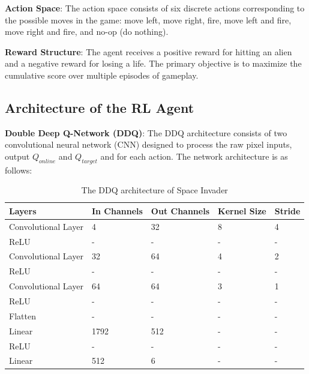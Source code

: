 \documentclass[preprint,12pt,3p,times]{elsarticle}
\begin{document}
\textbf{Action Space}: The action space consists of six discrete actions corresponding to the possible moves in the game: move left, move right, fire, move left and fire, move right and fire, and no-op (do nothing).

\textbf{Reward Structure}: The agent receives a positive reward for hitting an alien and a negative reward for losing a life. The primary objective is to maximize the cumulative score over multiple episodes of gameplay.

\subsection{Architecture of the RL Agent}
\textbf{Double Deep Q-Network (DDQ)}: The DDQ architecture consists of two convolutional neural network (CNN) designed to process the raw pixel inputs, output \(Q_{online}\) and \(Q_{target}\) and for each action. The network architecture is as follows:

\begin{table}[!h]
\centering
\caption{\label{t_data_stats}The DDQ architecture of Space Invader}
\begin{tabular}{p{4.5cm} p{2.5cm} p{2.5cm} p{2.5cm} p{2.5cm}}
\hline
Layers                 & In Channels & Out Channels & Kernel Size & Stride \\ \hline
Convolutional Layer    & 4           & 32           & 8           & 4 \\
ReLU                   & -           & -            & -           & - \\
Convolutional Layer    & 32          & 64           & 4           & 2 \\
ReLU                   & -           & -            & -           & - \\
Convolutional Layer    & 64          & 64           & 3           & 1 \\
ReLU                   & -           & -            & -           & - \\
Flatten                & -           & -            & -           & - \\
Linear                 & 1792        & 512          & -           & - \\
ReLU                   & -           & -            & -           & - \\
Linear                 & 512         & 6            & -           & - \\ \hline
\end{tabular}
\end{table}
\end{document}
